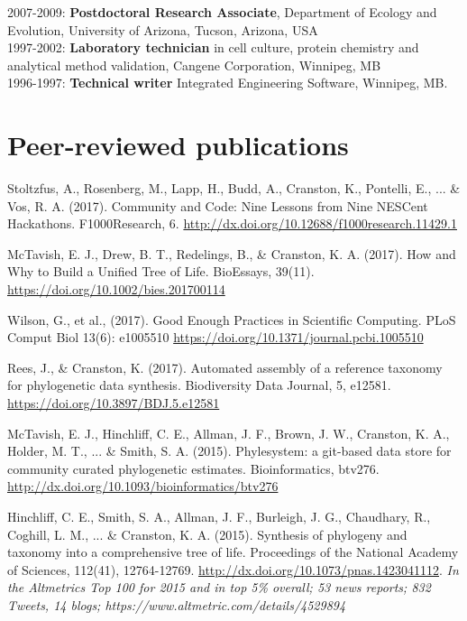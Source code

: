 \documentclass[10pt]{article}
\begin{document}
2007-2009: \textbf{Postdoctoral Research Associate}, Department of Ecology and Evolution, University of Arizona, Tucson, Arizona, USA \\

1997-2002: \textbf{Laboratory technician} in cell culture, protein chemistry and analytical method validation, Cangene Corporation, Winnipeg, MB  \\	
	
1996-1997: \textbf{Technical writer} Integrated Engineering Software, Winnipeg, MB.   \\		

\section*{Peer-reviewed publications}

Stoltzfus, A., Rosenberg, M., Lapp, H., Budd, A., Cranston, K., Pontelli, E., ... \& Vos, R. A. (2017). Community and Code: Nine Lessons from Nine NESCent Hackathons. F1000Research, 6. \url{http://dx.doi.org/10.12688/f1000research.11429.1}

McTavish, E. J., Drew, B. T., Redelings, B., \& Cranston, K. A. (2017). How and Why to Build a Unified Tree of Life. BioEssays, 39(11). \url{https://doi.org/10.1002/bies.201700114}

Wilson, G., et al., (2017). Good Enough Practices in Scientific Computing. PLoS Comput Biol 13(6): e1005510 \url{https://doi.org/10.1371/journal.pcbi.1005510}

Rees, J., \& Cranston, K. (2017). Automated assembly of a reference taxonomy for phylogenetic data synthesis. Biodiversity Data Journal, 5, e12581. \url{https://doi.org/10.3897/BDJ.5.e12581}

McTavish, E. J., Hinchliff, C. E., Allman, J. F., Brown, J. W., Cranston, K. A., Holder, M. T., ... \& Smith, S. A. (2015). Phylesystem: a git-based data store for community curated phylogenetic estimates. Bioinformatics, btv276. \url{http://dx.doi.org/10.1093/bioinformatics/btv276} 

Hinchliff, C. E., Smith, S. A., Allman, J. F., Burleigh, J. G., Chaudhary, R., Coghill, L. M., ... \& Cranston, K. A. (2015). Synthesis of phylogeny and taxonomy into a comprehensive tree of life. Proceedings of the National Academy of Sciences, 112(41), 12764-12769. \url{http://dx.doi.org/10.1073/pnas.1423041112}. \textit{In the Altmetrics Top 100 for 2015 and in top 5\% overall; 53 news reports; 832 Tweets, 14 blogs; https://www.altmetric.com/details/4529894}
\end{document}

